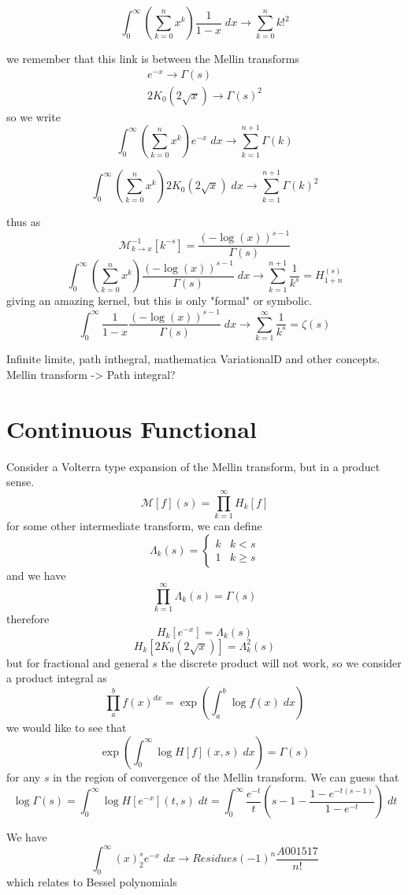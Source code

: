 \documentclass{article}
\begin{document}
$$
\int_0^\infty \left(\sum_{k=0}^n x^k\right) \frac{1}{1-x} \; dx \to \sum_{k=0}^n k!^2
$$

we remember that this link is between the Mellin transforms 
\begin{align}
e^{-x} \to \Gamma(s) \\
2 K_0(2 \sqrt{x}) \to \Gamma(s)^2 
\end{align}
so we write
$$
\int_0^\infty \left(\sum_{k=0}^n x^k\right) e^{-x} \; dx \to \sum_{k=1}^{n+1} \Gamma(k)
$$

$$
\int_0^\infty \left(\sum_{k=0}^n x^k\right) 2K_0(2 \sqrt{x}) \; dx \to \sum_{k=1}^{n+1} \Gamma(k)^2
$$

thus as 
$$
\mathcal{M}^{-1}_{k \to x}[k^{-s}] = \frac{(-\log(x))^{s-1}}{\Gamma(s)}
$$
$$
\int_0^\infty \left(\sum_{k=0}^n x^k\right) \frac{(-\log(x))^{s-1}}{\Gamma(s)} \; dx \to \sum_{k=1}^{n+1} \frac{1}{k^s} = H_{1+n}^{(s)}
$$
giving an amazing kernel, but this is only "formal" or symbolic.
$$
\int_0^\infty \frac{1}{1-x} \frac{(-\log(x))^{s-1}}{\Gamma(s)} \; dx \to \sum_{k=1}^{\infty} \frac{1}{k^s} = \zeta(s)
$$

Infinite limite, path inthegral, mathematica VariationalD and other concepts. Mellin transform -> Path integral? 


\section{Continuous Functional}
Consider a Volterra type expansion of the Mellin transform, but in a product sense. 
$$
\mathcal{M}[f](s) = \prod_{k=1}^\infty H_k[f]
$$
for some other intermediate transform, we can define 
$$
\Lambda_k(s) = \begin{cases} k & k<s \\ 1 & k \ge s \end{cases}
$$
and we have 
$$
\prod_{k=1}^\infty \Lambda_k(s) = \Gamma(s)
$$
therefore 
$$
H_k[e^{-x}] = \Lambda_k(s)
$$
$$
H_k[2K_0(2\sqrt{x})] = \Lambda_k^2(s)
$$
but for fractional and general $s$ the discrete product will not work, so we consider a product integral as 
$$
\prod_a^b f(x)^{dx} = \exp\left(\int_a^b \log f(x)\;dx \right)
$$
we would like to see that 
$$
\exp\left(\int_0^\infty \log H[f](x,s)\;dx \right) = \Gamma(s)
$$
for any $s$ in the region of convergence of the Mellin transform. We can guess that
$$
\log \Gamma(s) = \int_0^\infty \log H[e^{-x}](t,s)\;dt = \int_0^\infty \frac{e^{-t}}{t}\left(s-1-\frac{1-e^{-t(s-1)}}{1-e^{-t}}\right) \; dt
$$


We have 
$$
\int_0^\infty (x)_2^s e^{-x} \; dx \to Residues (-1)^n\frac{A001517}{n!}
$$
which relates to Bessel polynomials
\end{document}
